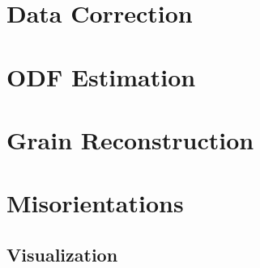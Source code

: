 \documentclass[compress]{beamer}
\begin{document}
\section{Data Correction}



\section{ODF Estimation}



\section{Grain Reconstruction}


\section{Misorientations}






\subsection*{Visualization}
\end{document}
